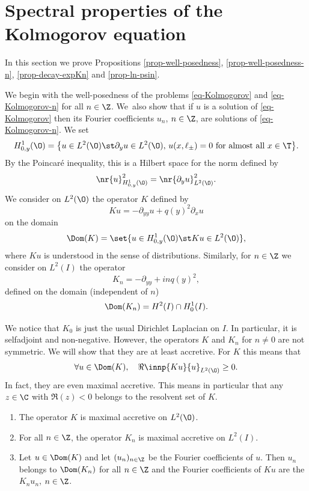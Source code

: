 \section{Spectral properties of the Kolmogorov equation} \label{sec-spectral}

In this section we prove Propositions \ref{prop-well-posedness}, \ref{prop-well-posedness-n}, \ref{prop-decay-expKn} and \ref{prop-ln-psin}.

 \label{sec-wellposedness-proof}

We begin with the well-posedness of the problems \eqref{eq-Kolmogorov} and \eqref{eq-Kolmogorov-n} for all $n \in \Z$. We~also show that if $u$ is a solution of \eqref{eq-Kolmogorov} then its Fourier coefficients $u_n$, $n\in\Z$, are solutions of \eqref{eq-Kolmogorov-n}. We set
\[
H^1_{0,y}(\O) = \bigl\{u \in L^2(\O) \st \partial_y u \in L^2(\O),\, u(x ,\ell_\pm) = 0 \text{ for almost all } x \in \T \bigr\}.
\]
By the Poincaré inequality, this is a Hilbert space for the norm defined by
\[
\nr{u}_{H^1_{0,y}(\O)}^2 = \nr{\partial_y u}_{L^2(\O)}^2.
\]
We consider on $L^2(\O)$ the operator $K$ defined by
\[
Ku = -\partial_{yy} u + q(y)^2 \partial_x u
\]
on the domain
\[
\Dom(K) = \set{u \in H^1_{0,y}(\O) \st K u \in L^2(\O)},
\]
where $Ku$ is understood in the sense of distributions. Similarly, for $n \in \Z$ we consider on $L^2(I)$ the operator
\begin{equation} \label{def-Kn}
K_n = -\partial_{yy} + i n q(y)^2,
\end{equation}
defined on the domain (independent of $n$)
\begin{equation} \label{dom-Kn}
\Dom(K_n) = H^2(I) \cap H_0^1(I).
\end{equation}

We notice that $K_0$ is just the usual Dirichlet Laplacian on $I$. In particular, it is selfadjoint and non-negative. However, the operators $K$ and $K_n$ for $n \neq 0$ are not symmetric. We will show that they are at least accretive. For $K$ this means that
\[
\forall u \in \Dom(K), \quad \Re \innp{K u}{u}_{L^2(\O)} \geq 0.
\]
In fact, they are even maximal accretive. This means in particular that any $z \in \C$ with $\Re(z) < 0$ belongs to the resolvent set of $K$.

\skpt
\begin{proposition}
\begin{enumerate}
\item The operator $K$ is maximal accretive on $L^2(\O)$.
\item For all $n \in \Z$, the operator $K_n$ is maximal accretive on $L^2(I)$.
\item Let $u \in \Dom(K)$ and let $(u_n)_{n \in \Z}$ be the Fourier coefficients of $u$. Then $u_n$ belongs to $\Dom(K_n)$ for all $n \in \Z$ and the Fourier coefficients of $Ku$ are the $K_n u_n$, $n \in \Z$.
\end{enumerate}
\label{prop-K-Kn}
\end{proposition}

